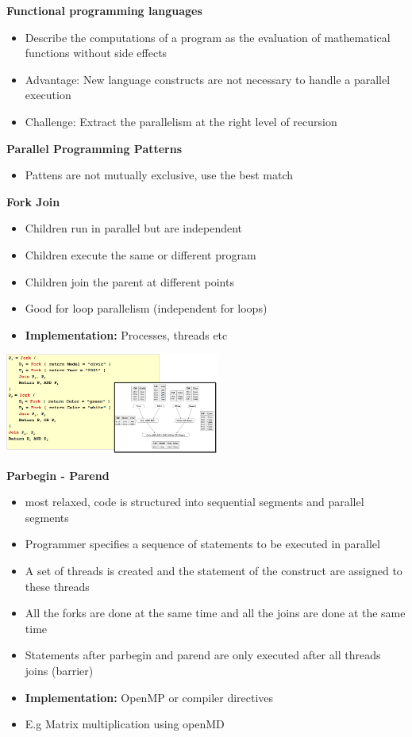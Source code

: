 \documentclass[10pt, landscape]{article}
\begin{document}
\begin{multicols}{4}
\textbf{Functional programming languages}
\begin{itemize}
    \item Describe the computations of a program as the evaluation of mathematical functions without side effects 
    \item Advantage: New language constructs are not necessary to handle a parallel execution 
    \item Challenge: Extract the parallelism at the right level of recursion
\end{itemize}


\textbf{Parallel Programming Patterns}
\begin{itemize}
    \item Pattens are not mutually exclusive, use the best match 
\end{itemize}

\textbf{Fork Join}
\begin{itemize}
    \item Children run in parallel but are independent 
    \item Children execute the same or different program 
    \item Children join the parent at different points 
    \item Good for loop parallelism (independent for loops)
    \item \textbf{Implementation: } Processes, threads etc
\end{itemize}

\includegraphics*[width=7cm]{db_fj}

\textbf{Parbegin - Parend}
\begin{itemize}
    \item most relaxed, code is structured into sequential segments and parallel segments
    \item Programmer specifies a sequence of statements to be executed in parallel 
    \item A set of threads is created and the statement of the construct are assigned to these threads 
    \item All the forks are done at the same time and all the joins are done at the same time 
    \item Statements after parbegin and parend are only executed after all threads joins (barrier)
    \item \textbf{Implementation: } OpenMP or compiler directives 
    \item E.g Matrix multiplication using openMD
\end{itemize}


\end{multicols}
\end{document}

